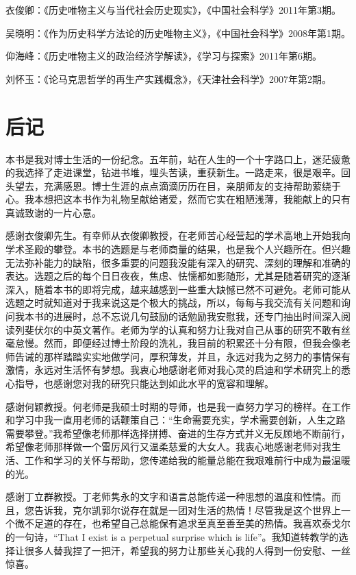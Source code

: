 \documentclass[UTF8, fontset = sourcesans, a4paper, oneside, zihao =
-4, scheme=chinese, no-math, space=true]{ctexbook}
\begin{document}
衣俊卿：《历史唯物主义与当代社会历史现实》，《中国社会科学》2011年第3期。

吴晓明：《作为历史科学方法论的历史唯物主义》，《中国社会科学》2008年第1期。

仰海峰：《历史唯物主义的政治经济学解读》，《学习与探索》2011年第6期。

刘怀玉：《论马克思哲学的再生产实践概念》，《天津社会科学》2007年第2期。

\protect\hypertarget{part0013.html}{}{}

\hypertarget{part0013.htmlux5cux23a013}{\chapter{后记}\label{part0013.htmlux5cux23a013}}

本书是我对博士生活的一份纪念。五年前，站在人生的一个十字路口上，迷茫疲惫的我选择了走进课堂，钻进书堆，埋头苦读，重获新生。一路走来，很是艰辛。回头望去，充满感恩。博士生涯的点点滴滴历历在目，亲朋师友的支持帮助萦绕于心。我本想把这本书作为礼物呈献给诸爱，然而它实在粗陋浅薄，我能献上的只有真诚致谢的一片心意。

感谢衣俊卿先生。有幸师从衣俊卿教授，在老师苦心经营起的学术高地上开始我向学术圣殿的攀登。本书的选题是与老师商量的结果，也是我个人兴趣所在。但兴趣无法弥补能力的缺陷，很多重要的问题我没能有深入的研究、深刻的理解和准确的表达。选题之后的每个日日夜夜，焦虑、怯懦都如影随形，尤其是随着研究的逐渐深入，随着本书的即将完成，越来越感到一些重大缺憾已然不可避免。老师可能从选题之时就知道对于我来说这是个极大的挑战，所以，每每与我交流有关问题和询问我本书的进展时，总不忘说几句鼓励的话勉励我安慰我，还专门抽出时间深入阅读列斐伏尔的中英文著作。老师为学的认真和努力让我对自己从事的研究不敢有丝毫怠慢。然而，即便经过博士阶段的洗礼，我目前的积累还十分有限，但我会像老师告诫的那样踏踏实实地做学问，厚积薄发，并且，永远对我为之努力的事情保有激情，永远对生活怀有梦想。我衷心地感谢老师对我心灵的启迪和学术研究上的悉心指导，也感谢您对我的研究只能达到如此水平的宽容和理解。

感谢何颖教授。何老师是我硕士时期的导师，也是我一直努力学习的榜样。在工作和学习中我一直用老师的话鞭策自己：``生命需要充实，学术需要创新，人生之路需要攀登。''我希望像老师那样选择拼搏、奋进的生存方式并义无反顾地不断前行，希望像老师那样做一个雷厉风行又温柔慈爱的大女人。我衷心地感谢老师对我生活、工作和学习的关怀与帮助，您传递给我的能量总能在我艰难前行中成为最温暖的光。

感谢丁立群教授。丁老师隽永的文字和语言总能传递一种思想的温度和性情。而且，您告诉我，克尔凯郭尔说存在就是一团对生活的热情！尽管我是这个世界上一个微不足道的存在，也希望自己总能保有追求至真至善至美的热情。我喜欢泰戈尔的一句诗，``That
I exist is a perpetual surprise which is
life''。我知道转教学的选择让很多人替我捏了一把汗，希望我的努力让那些关心我的人得到一份安慰、一丝惊喜。
\end{document}
